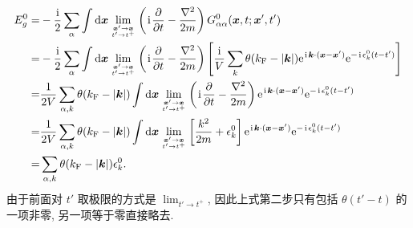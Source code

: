 \begin{align}
         E_g^{0}=&-\frac{\ii}{2}\sum_{\alpha}\int\dd\vct{x}\lim_{\vct{x}'\to\vct{x}\atop t'\to t^+}\ls \ii\frac{\pt}{\pt t}-\frac{\nabla^2}{2m} \rs G_{\alpha\alpha}^{0}(\vct{x},t;\vct{x}',t')\nonumber\\
         =&-\frac{\ii}{2}\sum_{\alpha}\int\dd\vct{x}\lim_{\vct{x}'\to\vct{x}\atop t'\to t^+}\ls \ii\frac{\pt}{\pt t}-\frac{\nabla^2}{2m} \rs\lmi \frac{\ii}{V}\sum_{k}\theta(k_{\fun{F}}-|\vct{k}|)\e^{\ii\vct{k}\cdot(\vct{x}-\vct{x}')}\e^{-\ii\epsilon_k^0(t-t')} \rmi\nonumber\\
         =&\frac{1}{2V}\sum_{\alpha,k}\theta(k_{\fun{F}}-|\vct{k}|)\int\dd\vct{x}\lim_{\vct{x}'\to\vct{x}\atop t'\to t^+}\ls \ii\frac{\pt}{\pt t}-\frac{\nabla^2}{2m} \rs \e^{\ii\vct{k}\cdot(\vct{x}-\vct{x}')}\e^{-\ii\epsilon_k^0(t-t')} \nonumber\\
         =&\frac{1}{2V}\sum_{\alpha, k}\theta(k_{\fun{F}}-|\vct{k}|)\int\dd\vct{x}\lim_{\vct{x}'\to\vct{x}\atop t'\to t^+}\lmi \frac{k^2}{2m}+\epsilon_k^0 \rmi \e^{\ii\vct{k}\cdot(\vct{x}-\vct{x}')}\e^{-\ii\epsilon_k^0(t-t')}\nonumber\\
         =&\sum_{\alpha,k}\theta(k_{\fun{F}}-|\vct{k}|)\epsilon_k^0.
    \end{align}
由于前面对 $t'$ 取极限的方式是 $\displaystyle\lim_{t'\to t^+}$, 因此上式第二步只有包括 $\theta(t'-t)$ 的一项非零, 另一项等于零直接略去.

